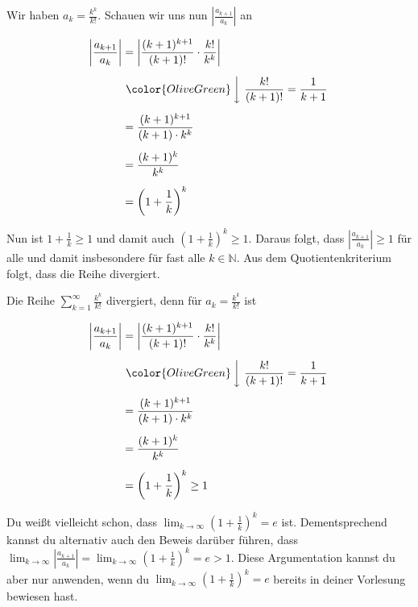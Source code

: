 \documentclass[fontsize=9pt,
               parskip=half-,
               DIV=14,
               listof=chapterentry,
               tocflat]{scrbook}
\begin{document}
\begin{solutionprocess*}
Wir haben $a_{k}={\tfrac {k^{k}}{k!}}$. Schauen wir uns nun $\left|{\tfrac {a_{k+1}}{a_{k}}}\right|$ an

\begin{align*}
\left|{\frac {a_{k+1}}{a_{k}}}\right|&=\left|{\frac {(k+1)^{k+1}}{(k+1)!}}\cdot {\frac {k!}{k^{k}}}\right|\\[0.5em]&\ {\color {OliveGreen}\left\downarrow \ {\frac {k!}{(k+1)!}}={\frac {1}{k+1}}\right.}\\[0.5em]&={\frac {(k+1)^{k+1}}{(k+1)\cdot k^{k}}}\\[0.5em]&={\frac {(k+1)^{k}}{k^{k}}}\\[0.5em]&=\left(1+{\frac {1}{k}}\right)^{k}
\end{align*}

Nun ist $1+{\tfrac {1}{k}}\geq 1$ und damit auch $\left(1+{\tfrac {1}{k}}\right)^{k}\geq 1$. Daraus folgt, dass $\left|{\tfrac {a_{k+1}}{a_{k}}}\right|\geq 1$ für alle und damit insbesondere für fast alle $k\in \mathbb {N} $. Aus dem Quotientenkriterium folgt, dass die Reihe divergiert.

\end{solutionprocess*}

\begin{proof*}
Die Reihe $\sum _{k=1}^{\infty }{\frac {k^{k}}{k!}}$ divergiert, denn für $a_{k}={\tfrac {k^{k}}{k!}}$ ist

\begin{align*}
\left|{\frac {a_{k+1}}{a_{k}}}\right|&=\left|{\frac {(k+1)^{k+1}}{(k+1)!}}\cdot {\frac {k!}{k^{k}}}\right|\\[0.5em]&\ {\color {OliveGreen}\left\downarrow \ {\frac {k!}{(k+1)!}}={\frac {1}{k+1}}\right.}\\[0.5em]&={\frac {(k+1)^{k+1}}{(k+1)\cdot k^{k}}}\\[0.5em]&={\frac {(k+1)^{k}}{k^{k}}}\\[0.5em]&=\left(1+{\frac {1}{k}}\right)^{k}\geq 1
\end{align*}

\end{proof*}

\begin{hint*}
Du weißt vielleicht schon, dass $\lim _{k\to \infty }\left(1+{\tfrac {1}{k}}\right)^{k}=e$ ist. Dementsprechend kannst du alternativ auch den Beweis darüber führen, dass $\lim _{k\to \infty }\left|{\tfrac {a_{k+1}}{a_{k}}}\right|=\lim _{k\to \infty }\left(1+{\tfrac {1}{k}}\right)^{k}=e>1$. Diese Argumentation kannst du aber nur anwenden, wenn du $\lim _{k\to \infty }\left(1+{\tfrac {1}{k}}\right)^{k}=e$ bereits in deiner Vorlesung bewiesen hast.

\end{hint*}
\end{document}

